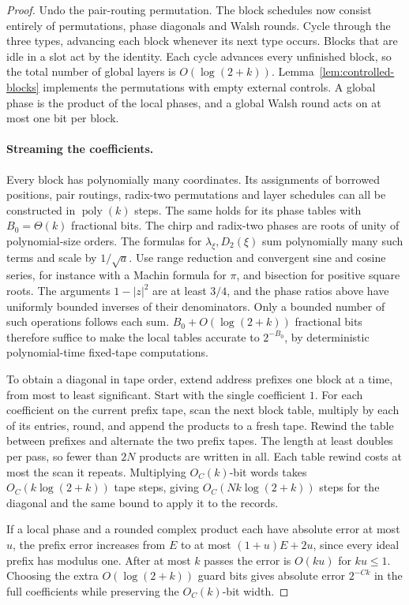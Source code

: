 \begin{proof}
Undo the pair-routing permutation. The block schedules now consist
entirely of permutations, phase diagonals and Walsh rounds. Cycle
through the three types, advancing each block whenever its next type
occurs. Blocks that are idle in a slot act by the identity. Each
cycle advances every unfinished block, so the total number of global
layers is \(O(\log(2+k))\). Lemma~\ref{lem:controlled-blocks}
implements the permutations with empty external controls. A global
phase is the product of the local phases, and a global Walsh round
acts on at most one bit per block.

\paragraph{Streaming the coefficients.}
Every block has polynomially many coordinates. Its assignments of
borrowed positions, pair routings, radix-two permutations and layer
schedules can all be constructed in \(\operatorname{poly}(k)\) steps.
The same holds for its phase tables with \(B_0=\Theta(k)\) fractional
bits. The chirp and radix-two phases are roots of unity of
polynomial-size orders. The formulas for \(\lambda_\xi,D_2(\xi)\)
sum polynomially many such terms and scale by \(1/\sqrt a\).
Use range reduction and convergent sine and cosine series, for instance
with a Machin formula for \(\pi\), and bisection for positive square
roots. The arguments \(1-|z|^2\) are at least \(3/4\), and the phase
ratios above have uniformly bounded inverses of their denominators.
Only a bounded number of such operations follows each sum.
\(B_0+O(\log(2+k))\) fractional bits therefore suffice to make
the local tables accurate to \(2^{-B_0}\), by deterministic
polynomial-time fixed-tape computations.

To obtain a diagonal in tape order, extend address prefixes one
block at a time, from most to least significant. Start with the single
coefficient \(1\). For each coefficient on the current prefix tape,
scan the next block table, multiply by each of its entries, round,
and append the products to a fresh tape. Rewind the table between
prefixes and alternate the two prefix tapes. The length at least
doubles per pass, so fewer than \(2N\) products are written in all.
Each table rewind costs at most the scan it repeats. Multiplying
\(O_C(k)\)-bit words takes \(O_C(k\log(2+k))\) tape steps, giving
\(O_C(Nk\log(2+k))\) steps for the diagonal and the same bound to
apply it to the records.

If a local phase and a rounded complex product each have absolute
error at most \(u\), the prefix error increases from \(E\) to at
most \((1+u)E+2u\), since every ideal prefix has modulus one. After
at most \(k\) passes the error is \(O(ku)\) for \(ku\le1\). Choosing
the extra \(O(\log(2+k))\) guard bits gives absolute error \(2^{-Ck}\)
in the full coefficients while preserving the \(O_C(k)\)-bit width.
\end{proof}

